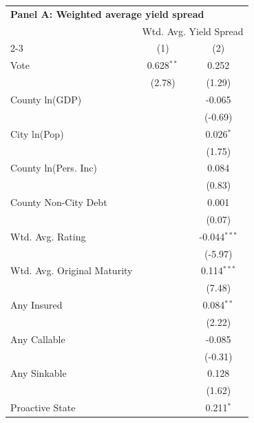 \begingroup
\centering
\begin{tabular*}{\textwidth}{@{\extracolsep{\fill}}lcc}
\multicolumn{3}{l}{\textbf{Panel A: Weighted average yield spread}}\\

\addlinespace
   \toprule
    & \multicolumn{2}{c}{Wtd. Avg. Yield Spread}\\
   \cmidrule(lr){2-3}
                               & (1)          & (2)\\  
   \midrule 
   Vote                        & 0.628$^{**}$ & 0.252\\   
                               & (2.78)      & (1.29)\\   
   County ln(GDP)              &              & -0.065\\   
                               &              & (-0.69)\\   
   City ln(Pop)                &              & 0.026$^{*}$\\   
                               &              & (1.75)\\   
   County ln(Pers. Inc)        &              & 0.084\\   
                               &              & (0.83)\\   
   County Non-City Debt        &              & 0.001\\   
                               &              & (0.07)\\   
   Wtd. Avg. Rating            &              & -0.044$^{***}$\\   
                               &              & (-5.97)\\   
   Wtd. Avg. Original Maturity &              & 0.114$^{***}$\\   
                               &              & (7.48)\\   
   Any Insured                 &              & 0.084$^{**}$\\   
                               &              & (2.22)\\   
   Any Callable                &              & -0.085\\   
                               &              & (-0.31)\\   
   Any Sinkable                &              & 0.128\\   
                               &              & (1.62)\\   
   Proactive State             &              & 0.211$^{*}$\\   

\end{tabular*}
